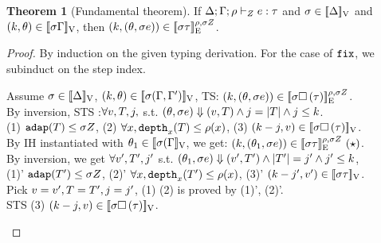 \documentclass[a4paper,11pt]{article}
\theoremstyle{definition}
\newtheorem{thm}{Theorem}
\begin{document}
{\color{red}
\begin{thm}[Fundamental theorem]
  If $\Delta; \Gamma; \rho \vdash_{Z} e: \tau$ and $ \sigma \in [\![ \Delta ]\!]_{\text{V}}$ and $(k, \theta)
  \in [\![ \sigma \Gamma ]\!]_{\text{V}}$, then $(k, (\theta, \sigma e)) \in
  [\![ \sigma \tau ]\!]_{\text{E}}^{\rho, \sigma Z}$.
\end{thm}%
}
\begin{proof}
By induction on the given typing derivation. For the case of
$\mathop{\mathtt{fix}}$, we subinduct on the step index.\\
\begin{mainitem} 
Assume $\sigma \in [\![ \Delta ]\!]_{\text{V}}$, $(k, \theta) \in [\![ \sigma (\Gamma, \Gamma') ]\!]_{\text{V}}$, TS: $(k, (\theta, \sigma e)) \in [\![ \sigma \mathtt{\square} \, (\tau) ]\!]_{\text{E}}^{\rho, \sigma Z}$.\\
%
By inversion, STS :$ \forall v, T, j, 
$ s.t. $ (\theta, \sigma e) \mathrel{\Downarrow} (v, T) \land j =
|T| \land j \leq k $.  \\
(1) $\mathtt{adap}(T) \leq \sigma Z $, (2) $\forall x, \mathtt{depth}_{x}(T) \leq \rho(x)$, (3) $(k-j, v) \in [\![  \sigma \mathtt{\square} \, (\tau)  ]\!]_{\text{V}} $. \\
%
By IH instantiated with $\theta_1 \in [\![ \sigma (\Gamma ]\!]_{\text{V}} $,  we get: $(k, (\theta_1, \sigma e)) \in [\![ \sigma \tau ]\!]_{\text{E}}^{\rho, \sigma Z}~(\star)$.\\
%
By inversion, we get $\forall v', T', j'$ s.t. $(\theta_1, \sigma e) \mathrel{\Downarrow} (v', T') \land |T'| = j' \land j' \leq k$,\\
(1)' $\mathtt{adap}(T') \leq \sigma Z$, (2)' $\forall x, \mathtt{depth}_{x}(T') \leq \rho(x)$, (3)' $(k - j', v') \in [\![ \sigma \tau ]\!]_{\text{V}}$.\\
%
Pick $v = v', T = T' , j = j'$, (1) (2) is proved by (1)', (2)'.\\
%
STS (3) $(k - j, v ) \in [\![ \sigma \mathtt{\square} \, (\tau) ]\!]_{\text{V}}$.\\

\end{mainitem}
\end{proof}
\end{document}
